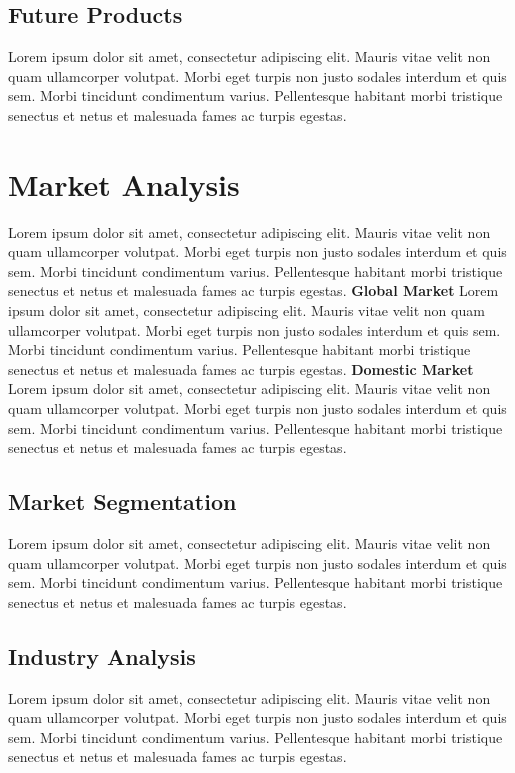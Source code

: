 \documentclass[11pt]{article}
\begin{document}
\subsection{Future Products}
Lorem ipsum dolor sit amet, consectetur adipiscing elit. Mauris vitae velit 
non quam ullamcorper volutpat. Morbi eget turpis non justo sodales interdum 
et quis sem. Morbi tincidunt condimentum varius. Pellentesque habitant morbi 
tristique senectus et netus et malesuada fames ac turpis egestas.\newline
\pagebreak

\section{Market Analysis}
Lorem ipsum dolor sit amet, consectetur adipiscing elit. Mauris vitae velit 
non quam ullamcorper volutpat. Morbi eget turpis non justo sodales interdum 
et quis sem. Morbi tincidunt condimentum varius. Pellentesque habitant morbi 
tristique senectus et netus et malesuada fames ac turpis egestas.\newline
\textbf{Global Market}\newline
Lorem ipsum dolor sit amet, consectetur adipiscing elit. Mauris vitae velit 
non quam ullamcorper volutpat. Morbi eget turpis non justo sodales interdum 
et quis sem. Morbi tincidunt condimentum varius. Pellentesque habitant morbi 
tristique senectus et netus et malesuada fames ac turpis egestas.\newline
\textbf{Domestic Market}\newline
Lorem ipsum dolor sit amet, consectetur adipiscing elit. Mauris vitae velit 
non quam ullamcorper volutpat. Morbi eget turpis non justo sodales interdum 
et quis sem. Morbi tincidunt condimentum varius. Pellentesque habitant morbi 
tristique senectus et netus et malesuada fames ac turpis egestas.\newline
\subsection{Market Segmentation}
Lorem ipsum dolor sit amet, consectetur adipiscing elit. Mauris vitae velit 
non quam ullamcorper volutpat. Morbi eget turpis non justo sodales interdum 
et quis sem. Morbi tincidunt condimentum varius. Pellentesque habitant morbi 
tristique senectus et netus et malesuada fames ac turpis egestas.\newline
\subsection{Industry Analysis}
Lorem ipsum dolor sit amet, consectetur adipiscing elit. Mauris vitae velit 
non quam ullamcorper volutpat. Morbi eget turpis non justo sodales interdum 
et quis sem. Morbi tincidunt condimentum varius. Pellentesque habitant morbi 
tristique senectus et netus et malesuada fames ac turpis egestas.\newline
\hypertarget{competition_and_buying_patterns}{}
\end{document}
